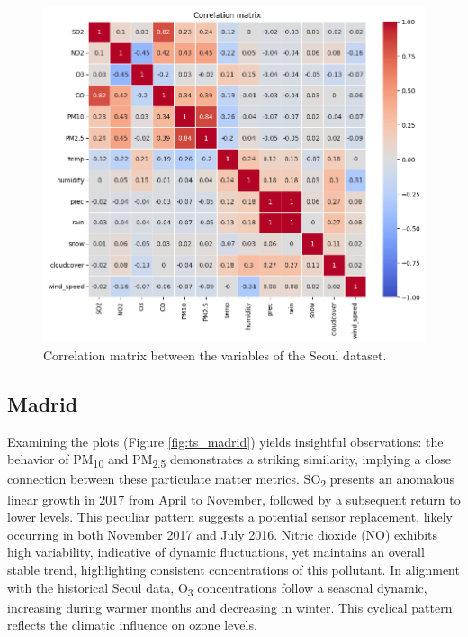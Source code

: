 \begin{figure}[h]
    \centering
    \includegraphics[width=0.75\linewidth]{images/corr_matrix_seoul.png}
    \caption{Correlation matrix between the variables of the Seoul dataset.}
    \label{fig:corr_matrix_seoul}
\end{figure}

\newpage
\subsection{Madrid}
Examining the plots (Figure \ref{fig:ts_madrid}) yields insightful observations:
the behavior of PM\textsubscript{10} and PM\textsubscript{2.5} demonstrates a striking similarity, implying a close connection between these particulate matter metrics.
SO\textsubscript{2} presents an anomalous linear growth in 2017 from April to November, followed by a subsequent return to lower levels. This peculiar pattern suggests a potential sensor replacement, likely occurring in both November 2017 and July 2016.
Nitric dioxide (NO) exhibits high variability, indicative of dynamic fluctuations, yet maintains an overall stable trend, highlighting consistent concentrations of this pollutant.
In alignment with the historical Seoul data, O\textsubscript{3} concentrations follow a seasonal dynamic, increasing during warmer months and decreasing in winter. This cyclical pattern reflects the climatic influence on ozone levels.

